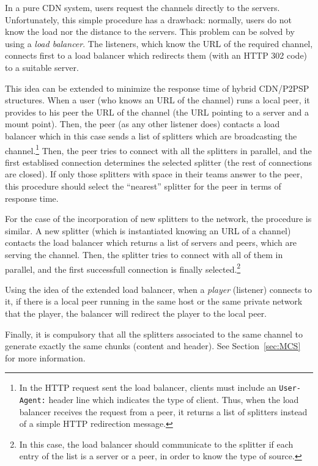 In a pure CDN system, users request the channels directly to the
servers. Unfortunately, this simple procedure has a drawback:
normally, users do not know the load nor the distance to the
servers. This problem can be solved by using a \emph{load
  balancer}. The listeners, which know the URL of the required
channel, connects first to a load balancer which redirects them (with
an HTTP 302 code) to a suitable server.

This idea can be extended to minimize the response time of hybrid
CDN/P2PSP structures. When a user (who knows an URL of the channel)
runs a local peer, it provides to his peer the URL of the channel (the
URL pointing to a server and a mount point). Then, the peer (as any
other listener does) contacts a load balancer which in this case sends
a list of splitters which are broadcasting the channel.\footnote{In
  the HTTP request sent the load balancer, clients must include an
  \texttt{User-Agent:} header line which indicates the type of
  client. Thus, when the load balancer receives the request from a
  peer, it returns a list of splitters instead of a simple HTTP
  redirection message.}  Then, the peer tries to connect with all the
splitters in parallel, and the first establised connection determines
the selected splitter (the rest of connections are closed). If only
those splitters with space in their teams answer to the peer, this
procedure should select the ``nearest'' splitter for the peer in terms
of response time.

For the case of the incorporation of new splitters to the network, the
procedure is similar. A new splitter (which is instantiated knowing an
URL of a channel) contacts the load balancer which returns a list of
servers and peers, which are serving the channel. Then, the splitter
tries to connect with all of them in parallel, and the first
successfull connection is finally selected.\footnote{In this case, the
  load balancer should communicate to the splitter if each entry of
  the list is a server or a peer, in order to know the type of
  source.}

Using the idea of the extended load balancer, when a \emph{player}
(listener) connects to it, if there is a local peer running in the
same host or the same private network that the player, the balancer
will redirect the player to the local peer.

Finally, it is compulsory that all the splitters associated to the
same channel to generate exactly the same chunks (content and
header). See Section~\ref{sec:MCS} for more information.

